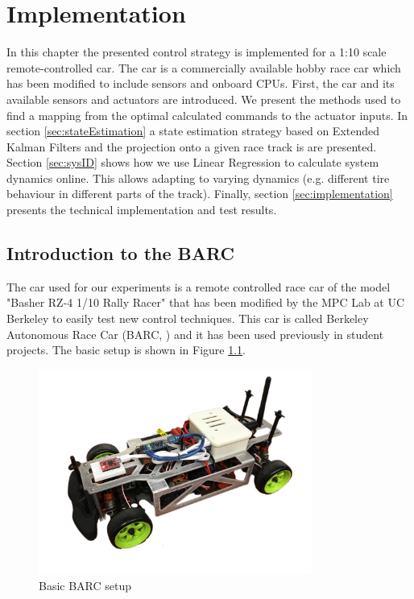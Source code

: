 \chapter{Implementation}
In this chapter the presented control strategy is implemented for a 1:10 scale remote-controlled car. The car is a commercially available hobby race car which has been modified to include sensors and onboard CPUs. First, the car and its available sensors and actuators are introduced. We present the methods used to find a mapping from the optimal calculated commands to the actuator inputs. In section \ref{sec:stateEstimation} a state estimation strategy based on Extended Kalman Filters and the projection onto a given race track is are presented. Section \ref{sec:sysID} shows how we use Linear Regression to calculate system dynamics online. This allows adapting to varying dynamics (e.g. different tire behaviour in different parts of the track). Finally, section \ref{sec:implementation} presents the technical implementation and test results.\\

\section{Introduction to the BARC}
The car used for our experiments is a remote controlled race car of the model "Basher RZ-4 1/10 Rally Racer" that has been modified by the MPC Lab at UC Berkeley to easily test new control techniques. This car is called Berkeley Autonomous Race Car (BARC, \cite{BARC}) and it has been used previously in student projects. The basic setup is shown in Figure \ref{fig:BARC}.
\begin{figure}[ht]
    \centering
  \includegraphics[width=0.8\textwidth]{../../Figures/BARC/IMG_1047.pdf}
    \caption{Basic BARC setup}
    \label{fig:BARC}
\end{figure}

